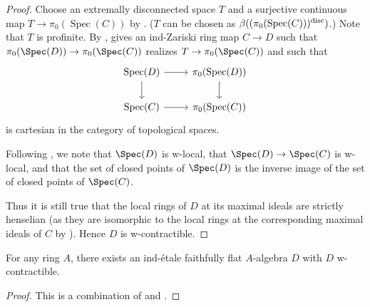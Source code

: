 \begin{proof}
  Choose an extremally disconnected space $T$ and a surjective continuous map $T \to \pi_0(\operatorname{Spec}(C))$ by . (\(T\) can be chosen as \(\beta((\pi_0(\operatorname{Spec}(C)))^{\textnormal{disc}})\).) Note that $T$ is profinite.
  By ,  gives an ind-Zariski ring map
  $C \to D$ such that $\pi_0(\Spec (D)) \to \pi_0(\Spec (C))$ realizes $T \to \pi_0(\Spec (C))$ and such that
  \[
  \begin{tikzcd}
  \operatorname{Spec}(D) \arrow[r] \arrow[d] & \pi_0(\operatorname{Spec}(D)) \arrow[d] \\
  \operatorname{Spec}(C) \arrow[r] & \pi_0(\operatorname{Spec}(C))
  \end{tikzcd}
  \]
  is cartesian in the category of topological spaces.

  Following , we note that $\Spec (D)$ is w-local, that $\Spec (D) \to \Spec (C)$ is w-local, and that the set of closed points of $\Spec (D)$ is the inverse image of the set of closed points of $\Spec (C)$.

  Thus it is still true that the local rings of $D$ at its maximal ideals are strictly henselian (as they are isomorphic to the local rings at the corresponding maximal ideals of $C$ by ). Hence $D$ is w-contractible.
\end{proof}

\begin{theorem}
  For any ring $A$, there exists an ind-étale faithfully flat $A$-algebra $D$ with $D$ w-contractible.
  \label{thm:ind-etale-w-contractible-cover-exists}
  \leanok
\end{theorem}

\begin{proof}
    \leanok
    This is a combination of  and .
\end{proof}


